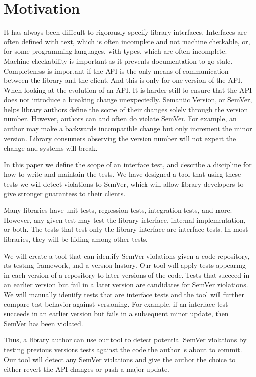 \section{Motivation}

It has always been difficult to rigorously specify library interfaces.
Interfaces are often defined with text, which is often incomplete and not
machine checkable,  or,  for some programming languages, with types, which are
often incomplete. Machine checkability is important as it prevents
documentation to go stale. Completeness is important if the API is the only
means of communication between the library and the client. And this is only for
one version of the API. When looking at the evolution of an API. It is harder
still to ensure that the API does not introduce a breaking change unexpectedly.
Semantic Version, or SemVer, helps library authors define the scope of their
changes solely through the version number.  However, authors can and often do
violate SemVer. For example, an author may make a backwards incompatible change
but only increment the minor version.  Library consumers observing the version
number will not expect the change and systems will break.

In this paper we define the scope of an interface test, and describe a
discipline for how to write and maintain the tests. We have designed a tool
that using these tests we will detect violations to SemVer, which will allow
library developers to give stronger guarantees to their clients. 

Many libraries have unit tests, regression tests, integration tests, and more.
However, any given test may test the library interface, internal
implementation, or both.  The tests that test only the library interface are
interface tests.  In most libraries, they will be hiding among other tests.

We will create a tool that can identify SemVer violations given a code
repository, its testing framework, and a version history.  Our tool will apply
tests appearing in each version of a repository to later versions of the code.
Tests that succeed in an earlier version but fail in a later version are
candidates for SemVer violations.  We will manually identify tests that are
interface tests and the tool will further compare test behavior against
versioning.  For example, if an interface test succeeds in an earlier version
but fails in a subsequent minor update, then SemVer has been violated.  

Thus, a library author can use our tool to detect potential SemVer violations
by testing previous versions tests against the code the author is about to
commit. Our tool will detect any SemVer violations and give the author the
choice to either revert the API changes or push a major update.
